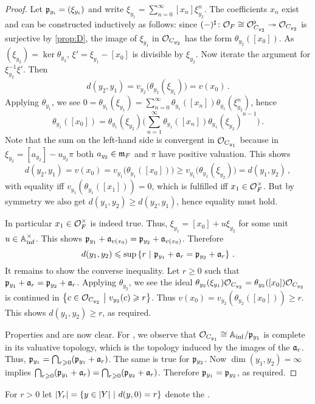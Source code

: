 \documentclass[a4paper, 10pt, oneside, DIV=9, chapterprefix=true, numbers=enddot,bibliography=totoc]{scrbook}
\begin{document}
\begin{proof}
	Let $\pp_{y_i}=(\xi_{y_i})$ and write $\xi_{y_1}=\sum_{n=0}^\infty [x_n]\xi_{y_2}^n$. The coefficients $x_n$ exist and can be constructed inductively as follows: since $(-)^\sharp\colon \Oo_F\cong \Oo_{C_{y_2}}^\flat\epimorphism \Oo_{C_{y_2}}$ is surjective by \cref{prop:D}, the image of $\xi_{y_1}$ in $\Oo_{C_{y_2}}$ has the form $\theta_{y_2}([x_0])$. As $(\xi_{y_2})=\ker\theta_{y_2}$, $\xi'=\xi_{y_1}-[x_0]$ is divisible by $\xi_{y_2}$. Now iterate the argument for $\xi_{y_2}^{-1}\xi'$. Then
	\begin{equation*}
		d(y_2,y_1)=v_{y_2}\big(\theta_{y_2}(\xi_{y_1})\big)=v(x_0)\,.
	\end{equation*}
	Applying $\theta_{y_1}$, we see $0=\theta_{y_1}(\xi_{y_1})=\sum_{n=0}^\infty\theta_{y_1}([x_n])\theta_{y_1}(\xi_{y_2}^n)$, hence
	\begin{equation*}
		\theta_{y_1}([x_0])=\theta_{y_1}(\xi_{y_2})\Bigg(\sum_{n=1}^\infty\theta_{y_1}([x_n])\theta_{y_1}(\xi_{y_2})^{n-1}\Bigg)\,.
	\end{equation*}
	Note that the sum on the left-hand side is convergent in $\Oo_{C_{y_1}}$ because in $\xi_{y_2}=[a_{y_2}]-u_{y_2}\pi$ both $a_{y_2}\in\mm_F$ and $\pi$ have positive valuation. This shows
	\begin{equation*}
		d(y_2,y_1)=v(x_0)=v_{y_1}\big(\theta_{y_1}([x_0])\big)\geq v_{y_1}\big(\theta_{y_1}(\xi_{y_2})\big)=d(y_1,y_2)\,,
	\end{equation*}
	with equality iff $v_{y_1}(\theta_{y_1}([x_1]))=0$, which is fulfilled iff $x_1\in\Oo_F^\times$. But by symmetry we also get $d(y_1,y_2)\geq d(y_2,y_1)$, hence equality must hold.
	
	In particular $x_1\in\Oo_F^\times$ is indeed true. Thus, $\xi_{y_1}=[x_0]+u\xi_{y_2}$ for some unit $u\in \IA_\inf^\times$. This shows $\pp_{y_1}+\aa_{v(x_0)}=\pp_{y_2}+\aa_{v(x_0)}$. Therefore
	\begin{equation*}
		d(y_1,y_2)\leq \sup\left\{r\st \pp_{y_1}+\aa_r=\pp_{y_2}+\aa_r\right\}\,.
	\end{equation*}
	It remains to show the converse inequality. Let $r\geq 0$ such that $\pp_{y_1}+\aa_r=\pp_{y_2}+\aa_r$. Applying $\theta_{y_2}$, we see the ideal $\theta_{y_2}(\xi_{y_1})\Oo_{C_{y_2}}=\theta_{y_2}([x_0])\Oo_{C_{y_2}}$ is continued in $\left\{c\in\Oo_{C_{y_2}}\st v_{y_2}(c)\geq r\right\}$. Thus $v(x_0)=v_{y_2}(\theta_{y_2}([x_0]))\geq r$. This shows $d(y_1,y_2)\geq r$, as required.
	
	Properties  and  are now clear. For , we observe that $\Oo_{C_{y_1}}\cong \IA_\inf/\pp_{y_1}$ is complete in its valuative topology, which is the topology induced by the images of the $\aa_r$. Thus, $\pp_{y_1}=\bigcap_{r\geq 0}(\pp_{y_1}+\aa_r)$. The same is true for $\pp_{y_2}$. Now $\dim(y_1,y_2)=\infty$ implies $\bigcap_{r\geq 0}(\pp_{y_1}+\aa_r)=\bigcap_{r\geq 0}(\pp_{y_2}+\aa_r)$. Therefore $\pp_{y_1}=\pp_{y_2}$, as required.
\end{proof}
\begin{defi}
	For $r>0$ let $|Y_r|=\left\{y\in|Y|\st d(y,0)=r\right\}$ denote the .
\end{defi}
\end{document}
